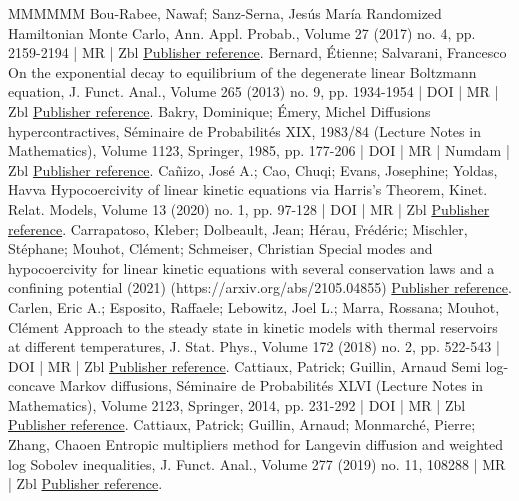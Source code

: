 \begin{thebibliography}{MMMMMM}
 Bou-Rabee, Nawaf; Sanz-Serna, Jesús María Randomized Hamiltonian Monte Carlo, Ann. Appl. Probab., Volume 27 (2017) no. 4, pp. 2159-2194 | MR | Zbl \href{https://ahl.centre-mersenne.org/item/AHL_2022__5__523_0/#BRSS17}{Publisher reference}.
 Bernard, Étienne; Salvarani, Francesco On the exponential decay to equilibrium of the degenerate linear Boltzmann equation, J. Funct. Anal., Volume 265 (2013) no. 9, pp. 1934-1954 | DOI | MR | Zbl \href{https://ahl.centre-mersenne.org/item/AHL_2022__5__523_0/#BS13}{Publisher reference}.
 Bakry, Dominique; Émery, Michel Diffusions hypercontractives, Séminaire de Probabilités XIX, 1983/84 (Lecture Notes in Mathematics), Volume 1123, Springer, 1985, pp. 177-206 | DOI | MR | Numdam | Zbl \href{https://ahl.centre-mersenne.org/item/AHL_2022__5__523_0/#BE85}{Publisher reference}.
 Cañizo, José A.; Cao, Chuqi; Evans, Josephine; Yoldas, Havva Hypocoercivity of linear kinetic equations via Harris’s Theorem, Kinet. Relat. Models, Volume 13 (2020) no. 1, pp. 97-128 | DOI | MR | Zbl \href{https://ahl.centre-mersenne.org/item/AHL_2022__5__523_0/#CCEY19}{Publisher reference}.
 Carrapatoso, Kleber; Dolbeault, Jean; Hérau, Frédéric; Mischler, Stéphane; Mouhot, Clément; Schmeiser, Christian Special modes and hypocoercivity for linear kinetic equations with several conservation laws and a confining potential (2021) (https://arxiv.org/abs/2105.04855) \href{https://ahl.centre-mersenne.org/item/AHL_2022__5__523_0/#CDHMMS21}{Publisher reference}.
 Carlen, Eric A.; Esposito, Raffaele; Lebowitz, Joel L.; Marra, Rossana; Mouhot, Clément Approach to the steady state in kinetic models with thermal reservoirs at different temperatures, J. Stat. Phys., Volume 172 (2018) no. 2, pp. 522-543 | DOI | MR | Zbl \href{https://ahl.centre-mersenne.org/item/AHL_2022__5__523_0/#CELMM}{Publisher reference}.
 Cattiaux, Patrick; Guillin, Arnaud Semi log-concave Markov diffusions, Séminaire de Probabilités XLVI (Lecture Notes in Mathematics), Volume 2123, Springer, 2014, pp. 231-292 | DOI | MR | Zbl \href{https://ahl.centre-mersenne.org/item/AHL_2022__5__523_0/#CG14}{Publisher reference}.
 Cattiaux, Patrick; Guillin, Arnaud; Monmarché, Pierre; Zhang, Chaoen Entropic multipliers method for Langevin diffusion and weighted log Sobolev inequalities, J. Funct. Anal., Volume 277 (2019) no. 11, 108288 | MR | Zbl \href{https://ahl.centre-mersenne.org/item/AHL_2022__5__523_0/#CGMZ19}{Publisher reference}.

\end{thebibliography}
